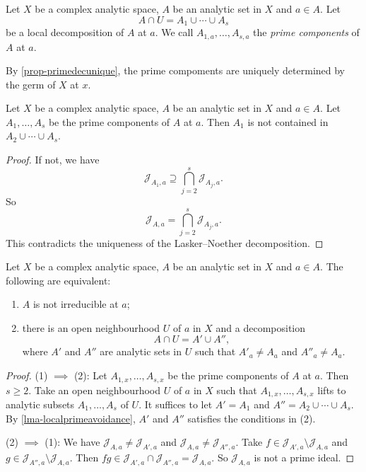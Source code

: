 \begin{definition}
    Let $X$ be a complex analytic space, $A$ be an analytic set in $X$ and $a\in A$. Let 
    \[
        A\cap U=A_1  \cup\cdots\cup A_s
    \] 
    be a local decomposition of $A$ at $a$. We call $A_{1,a},\ldots,A_{s,a}$ the \emph{prime components} of $A$ at $a$. 
\end{definition}
By \cref{prop-primedecunique}, the prime compoments are uniquely determined by the germ of $X$ at $x$.

\begin{lemma}\label{lma-localprimeavoidance}
    Let $X$ be a complex analytic space, $A$ be an analytic set in $X$ and $a\in A$. Let $A_1,\ldots,A_s$ be the prime components of $A$ at $a$. Then $A_1$ is not contained in $A_{2}\cup\cdots\cup A_s$.
\end{lemma}
\begin{proof}
    If not, we have 
    \[
        \mathcal{J}_{A_1,a}\supseteq  \bigcap_{j=2}^s \mathcal{J}_{A_j,a}.
    \]
    So
    \[
        \mathcal{J}_{A,a}=  \bigcap_{j=2}^s \mathcal{J}_{A_j,a}.
    \]
    This contradicts the uniqueness of the Lasker--Noether decomposition.
\end{proof}

\begin{proposition}
    Let $X$ be a complex analytic space, $A$ be an analytic set in $X$ and $a\in A$. The following are equivalent:
    \begin{enumerate}
        \item $A$ is not irreducible at $a$;
        \item there is an open neighbourhood $U$ of $a$ in $X$ and a decomposition
            \[
                A\cap U=A'\cup A'',    
            \]
            where $A'$ and $A''$ are analytic sets in $U$ such that $A'_a\neq A_a$ and $A''_a\neq A_a$.
    \end{enumerate}
\end{proposition}
\begin{proof}
    (1) $\implies$ (2): Let $A_{1,x},\ldots,A_{s,x}$ be the prime components of $A$ at $a$. Then $s\geq 2$.
    Take an open neighbourhood $U$ of $a$ in $X$ such that $A_{1,x},\ldots,A_{s,x}$ lifts to analytic subsets $A_1,\ldots,A_s$ of $U$. It suffices to let $A'=A_1$ and $A''=A_2\cup\cdots\cup A_s$. By \cref{lma-localprimeavoidance}, $A'$ and $A''$ satisfies the conditions in (2).

    (2) $\implies$ (1): We have $\mathcal{J}_{A,a}\neq \mathcal{J}_{A',a}$ and $\mathcal{J}_{A,a}\neq \mathcal{J}_{A'',a}$. Take $f\in \mathcal{J}_{A',a}\setminus \mathcal{J}_{A,a}$ and $g\in \mathcal{J}_{A'',a}\setminus \mathcal{J}_{A,a}$. Then $fg\in \mathcal{J}_{A',a}\cap \mathcal{J}_{A'',a}=\mathcal{J}_{A,a}$. So $\mathcal{J}_{A,a}$ is not a prime ideal.
\end{proof}


\printbibliography
